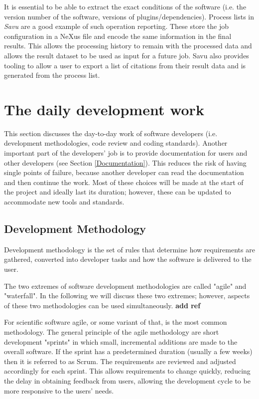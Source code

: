 \documentclass[jnr]{iosart2x}
\newcommand{\todo}[1]{\textbf{#1}}
\begin{document}
It is essential to be able to extract the exact conditions of the software (i.e. the version number of the software, versions of plugins/dependencies).
Process lists in {\it Savu} \cite{Wadeson_2016} are a good example of such operation reporting.
These store the job configuration in a NeXus file and encode the same information in the final results.
This allows the processing history to remain with the processed data and allows the result dataset to be used as input for a future job.
Savu also provides tooling to allow a user to export a list of citations from their result data and is generated from the process list.

\section{The daily development work}
\label{Business as Usual}

This section discusses the day-to-day work of software developers (i.e. development methodologies, code review and coding standards).
Another important part of the developers' job is to provide documentation for users and other developers (see Section \ref{Documentation}).
This reduces the risk of having single points of failure, because another developer can read the documentation and then continue the work.
Most of these choices will be made at the start of the project and ideally last its duration; however, these can be updated to accommodate new tools and standards.

\subsection{Development Methodology}
\label{Development methodology}

Development methodology is the set of rules that determine how requirements are gathered, converted into developer tasks and how the software is delivered to the user.

The two extremes of software development methodologies are called "agile" and "waterfall".
In the following we will discuss these two extremes; however, aspects of these two methodologies can be used simultaneously. \todo{add ref}

For scientific software agile, or some variant of that, is the most common methodology.
The general principle of the agile methodology are short development "sprints" in which small, incremental additions are made to the overall software.
If the sprint has a predetermined duration (usually a few weeks) then it is referred to as Scrum.
The requirements are reviewed and adjusted accordingly for each sprint.
This allows requirements to change quickly, reducing the delay in obtaining feedback from users, allowing the development cycle to be more responsive to the users' needs.
\end{document}
